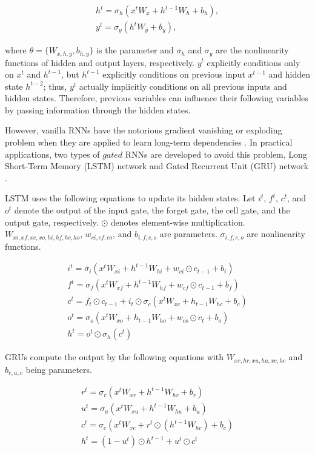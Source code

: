 \documentclass[10pt,twocolumn,letterpaper]{article}
\begin{document}
\begin{gather}
  h^{t} = \sigma_{h}({x^{t}W_x + h^{t-1}W_h+b_h} ),
  \\
  y^{t} = \sigma_{y}({h^{t}W_y + b_y}),
\end{gather}

\noindent
where $\theta = \{W_{x,h,y},b_{h,y}\}$ is the parameter and $\sigma_h$ and $\sigma_y$ are the nonlinearity functions of hidden and output layers, respectively. $y^t$ explicitly conditions only on $x^t$ and $h^{t-1}$, but $h^{t-1}$ explicitly conditions on previous input $x^{t-1}$ and hidden state $h^{t-2}$; thus, $y^t$ actually implicitly conditions on all previous inputs and hidden states. Therefore, previous variables can influence their following variables by passing information through the hidden states.

However, vanilla RNNs have the notorious gradient vanishing or exploding problem when they are applied to learn long-term dependencies \cite{12, 29}. In practical applications, two types of $gated$ RNNs are developed to avoid this problem, Long Short-Term Memory (LSTM) network \cite{30} and Gated Recurrent Unit (GRU) network \cite{31}. 

LSTM uses the following equations to update its hidden states. Let $i^t$, $f^t$, $c^t$, and $o^t$ denote the output of the input gate, the forget gate, the cell gate, and the output gate, respectively. $\odot$ denotes element-wise multiplication. $W_{xi,xf,xc,xo,hi,hf,hc,ho}$, $w_{ci,cf,co}$, and $b_{i,f,c,o}$ are parameters. $\sigma_{i,f,c,o}$ are nonlinearity functions.

\begin{gather}
   i^t = \sigma_i (  x^t W_{xi} + h^{t-1} W_{hi} + w_{ci} \odot c_{t-1} + b_i       )    \\
   f^t = \sigma_f (  x^t W_{xf} + h^{t-1} W_{hf} + w_{cf} \odot c_{t-1} + b_f       )    \\
   c^t =  f_t \odot c_{t-1} + i_t \odot \sigma_c ( x^t W_{xc} + h_{t-1}W_{hc} + b_c  )  \\
   o^t = \sigma_o (  x^t W_{xo} + h_{t-1} W_{ho} + w_{co} \odot c_t + b_o  ) \\
   h^t = o^t \odot \sigma_h (c^t)
\end{gather}



GRUs compute the output by the following equations with $W_{xr,hr,xu,hu,xc,hc}$ and $b_{r,u,c}$ being parameters.

\begin{gather}
   r^t = \sigma_r (  x^t W_{xr} + h^{t-1} W_{hr} + b_r       )    \\
   u^t = \sigma_u (  x^t W_{xu} + h^{t-1} W_{hu} + b_u       )    \\   
   c^t = \sigma_c (  x^t W_{xc} +  r^t \odot (  h^{t-1} W_{hc} ) + b_c       )    \\
   h^t = (1-u^t) \odot h^{t-1} + u^t \odot c^t
\end{gather}
\end{document}
